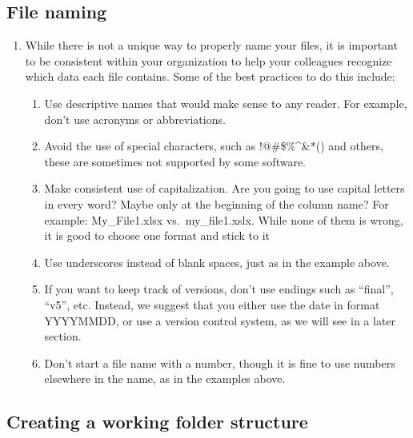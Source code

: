 \documentclass[
]{book}
\providecommand{\tightlist}{%
  \setlength{\itemsep}{0pt}\setlength{\parskip}{0pt}}
\begin{document}
\hypertarget{file-naming}{%
\subsection{File naming}\label{file-naming}}

\begin{enumerate}
\def\labelenumi{\arabic{enumi}.}
\tightlist
\item
  While there is not a unique way to properly name your files, it is important to be consistent within your organization to help your colleagues recognize which data each file contains. Some of the best practices to do this include:

  \begin{enumerate}
  \def\labelenumii{\arabic{enumii}.}
  \tightlist
  \item
    Use descriptive names that would make sense to any reader. For example, don't use acronyms or abbreviations.
  \item
    Avoid the use of special characters, such as !@\#\$\%\^{}\&*() and others, these are sometimes not supported by some software.
  \item
    Make consistent use of capitalization. Are you going to use capital letters in every word? Maybe only at the beginning of the column name? For example: My\_File1.xlsx vs.~my\_file1.xslx. While none of them is wrong, it is good to choose one format and stick to it
  \item
    Use underscores instead of blank spaces, just as in the example above.
  \item
    If you want to keep track of versions, don't use endings such as ``final'', ``v5'', etc. Instead, we suggest that you either use the date in format YYYYMMDD, or use a version control system, as we will see in a later section.
  \item
    Don't start a file name with a number, though it is fine to use numbers elsewhere in the name, as in the examples above.
  \end{enumerate}
\end{enumerate}

\hypertarget{creating-a-working-folder-structure}{%
\subsection{Creating a working folder structure}\label{creating-a-working-folder-structure}}
\end{document}
